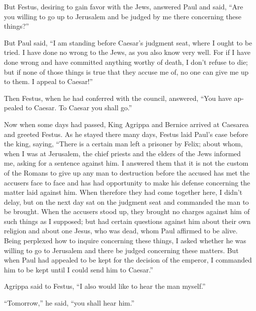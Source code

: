\begin{paracol}{2}
\begin{otherlanguage}{english}
 But Festus, desiring to gain favor with the Jews,
answered Paul and said, ``Are you willing to go up to Jerusalem and be
judged by me there concerning these things?''

 But Paul said, ``I am standing before Caesar's judgment
seat, where I ought to be tried. I have done no wrong to the Jews, as
you also know very well.  For if I have done wrong and
have committed anything worthy of death, I don't refuse to die; but if
none of those things is true that they accuse me of, no one can give me
up to them. I appeal to Caesar!''

 Then Festus, when he had conferred with the council,
answered, ``You have appealed to Caesar. To Caesar you shall go.''

 Now when some days had passed, King Agrippa and Bernice
arrived at Caesarea and greeted Festus.  As he stayed
there many days, Festus laid Paul's case before the king, saying,
``There is a certain man left a prisoner by Felix;  about
whom, when I was at Jerusalem, the chief priests and the elders of the
Jews informed me, asking for a sentence against him.  I
answered them that it is not the custom of the Romans to give up any man
to destruction before the accused has met the accusers face to face and
has had opportunity to make his defense concerning the matter laid
against him.  When therefore they had come together here,
I didn't delay, but on the next day sat on the judgment seat and
commanded the man to be brought.  When the accusers stood
up, they brought no charges against him of such things as I supposed;
 but had certain questions against him about their own
religion and about one Jesus, who was dead, whom Paul affirmed to be
alive.  Being perplexed how to inquire concerning these
things, I asked whether he was willing to go to Jerusalem and there be
judged concerning these matters.  But when Paul had
appealed to be kept for the decision of the emperor, I commanded him to
be kept until I could send him to Caesar.''

 Agrippa said to Festus, ``I also would like to hear the
man myself.''

``Tomorrow,'' he said, ``you shall hear him.''


\end{otherlanguage}
\end{paracol}
